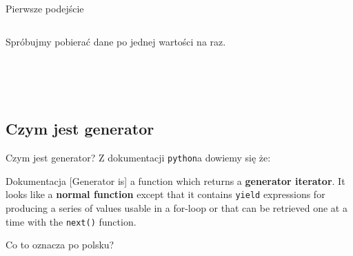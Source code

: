 \documentclass[aspectratio=169]{beamer}
\begin{document}
\begin{frame}[fragile]{Pierwsze podejście}

  \begin{columns}
    \begin{column}{0.5 \textwidth}

      Spróbujmy pobierać dane po jednej wartości na raz.\\~\\

      \\~\\


    \end{column}
    \begin{column}{0.5 \textwidth}
      \scriptsize
      \inputminted[linenos]{python}{./examples/whilelooped.py}
    \end{column}
  \end{columns}
  
\end{frame}

\subsection{Czym jest generator}
\begin{frame}{Czym jest generator?}
  Z dokumentacji \texttt{python}a dowiemy się że:

  \pause

  \begin{block}{Dokumentacja}
    [Generator is] a function which returns a \textbf{generator iterator}. It 
    looks like a \textbf{normal function} except that it contains
    \texttt{yield}
    expressions for producing a series of values usable in a for-loop or that 
    can be retrieved one at a time with the \texttt{next()} function.
  \end{block}

  \pause

  Co to oznacza po polsku?
\end{frame}
\end{document}
